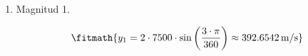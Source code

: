 \begin{enumerate}

\item Magnitud 1.

\[\fitmath{y_{1}=2\cdot 7500\cdot \sin\left(\frac{3\cdot \pi}{360}\right)\approx 392.6542\,\mathrm{m/s}}\]

\end{enumerate}
